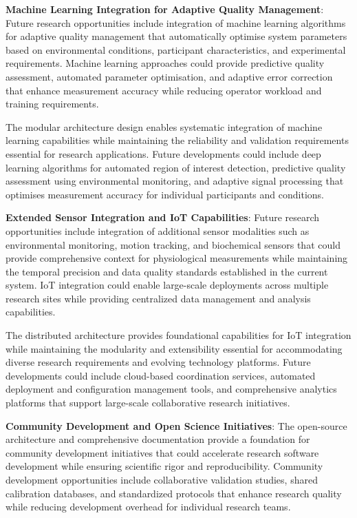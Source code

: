 \documentclass[11pt,a4paper]{report}
\begin{document}
\noindent \textbf{Machine Learning Integration for Adaptive Quality Management}: Future research opportunities include integration of machine learning algorithms for adaptive quality management that automatically optimise system parameters based on environmental conditions, participant characteristics, and experimental requirements. Machine learning approaches could provide predictive quality assessment, automated parameter optimisation, and adaptive error correction that enhance measurement accuracy while reducing operator workload and training requirements.

The modular architecture design enables systematic integration of machine learning capabilities while maintaining the reliability and validation requirements essential for research applications. Future developments could include deep learning algorithms for automated region of interest detection, predictive quality assessment using environmental monitoring, and adaptive signal processing that optimises measurement accuracy for individual participants and conditions.

\noindent \textbf{Extended Sensor Integration and IoT Capabilities}: Future research opportunities include integration of additional sensor modalities such as environmental monitoring, motion tracking, and biochemical sensors that could provide comprehensive context for physiological measurements while maintaining the temporal precision and data quality standards established in the current system. IoT integration could enable large-scale deployments across multiple research sites while providing centralized data management and analysis capabilities.

The distributed architecture provides foundational capabilities for IoT integration while maintaining the modularity and extensibility essential for accommodating diverse research requirements and evolving technology platforms. Future developments could include cloud-based coordination services, automated deployment and configuration management tools, and comprehensive analytics platforms that support large-scale collaborative research initiatives.

\noindent \textbf{Community Development and Open Science Initiatives}: The open-source architecture and comprehensive documentation provide a foundation for community development initiatives that could accelerate research software development while ensuring scientific rigor and reproducibility. Community development opportunities include collaborative validation studies, shared calibration databases, and standardized protocols that enhance research quality while reducing development overhead for individual research teams.
\end{document}
